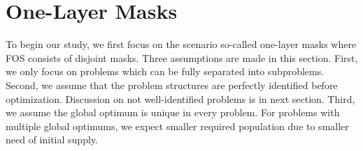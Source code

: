 \documentclass{sig-alternate}
\begin{document}
%
%



\section{One-Layer Masks}
\label{sec:nonOverlappingMasks}

To begin our study, we first focus on the scenario so-called one-layer masks where FOS consists of disjoint masks.
Three assumptions are made in this section.
First, we only focus on problems which can be fully separated into subproblems.
Second, we assume that the problem structures are perfectly identified before optimization.
Discussion on not well-identified problems is in next section.
Third, we assume the global optimum is unique in every problem.
For problems with multiple global optimums, we expect smaller required population due to smaller need of initial supply.



\end{document}
